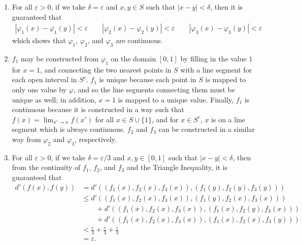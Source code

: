 \documentclass[a4paper,12pt]{article}
\begin{document}
\begin{enumerate}
\begin{enumerate}
                \item
                    For all $\varepsilon > 0$, if we take $\delta = \varepsilon$ and $x, y \in S$ such that $|x - y| < \delta$, then it is guaranteed that
                    \begin{align*}
                        |\varphi_1(x) - \varphi_1(y)| < \varepsilon \qquad 
                        |\varphi_2(x) - \varphi_2(y)| < \varepsilon \qquad
                        |\varphi_3(x) - \varphi_3(y)| < \varepsilon
                    \end{align*}
                    which shows that $\varphi_1$, $\varphi_2$, and $\varphi_3$ are continuous.

                \item
                    $f_1$ may be constructed from $\varphi_1$ on the domain $[0, 1]$ by filling in the value $1$ for $x = 1$, and connecting the two nearest points in $S$ with a line segment for each open interval in $S^c$. $f_1$ is unique because each point in $S$ is mapped to only one value by $\varphi$, and so the line segments connecting them must be unique as well; in addition, $x = 1$ is mapped to a unique value. Finally, $f_1$ is continuous because it is constructed in a way such that $f(x) = \lim_{x' \to x} f(x')$ for all $x \in S \cup \{1\}$, and for $x \in S^c$, $x$ is on a line segment which is always continuous. $f_2$ and $f_3$ can be constructed in a similar way from $\varphi_2$ and $\varphi_3$, respectively.

                \item
                    For all $\varepsilon > 0$, if we take $\delta = \varepsilon / 3$ and $x, y \in [0, 1]$ such that $|x - y| < \delta$, then from the continuity of $f_1$, $f_2$, and $f_3$ and the Triangle Inequality, it is guaranteed that
                    \begin{align*}
                        d'(f(x), f(y)) &= d'((f_1(x), f_2(x), f_3(x)), (f_1(y), f_2(y), f_3(y))) \\
                        &\leq d'((f_1(x), f_2(x), f_3(x)), (f_1(y), f_2(x), f_3(x))) \\
                        &\qquad+ d'((f_1(x), f_2(x), f_3(x)), (f_1(x), f_2(y), f_3(x))) \\
                        &\qquad+ d'((f_1(x), f_2(x), f_3(x)), (f_1(x), f_2(x), f_3(y))) \\
                        &< \frac{\varepsilon}{3} + \frac{\varepsilon}{3} + \frac{\varepsilon}{3} \\
                        &= \varepsilon.
                    \end{align*}
            \end{enumerate}


\end{enumerate}
\end{document}

